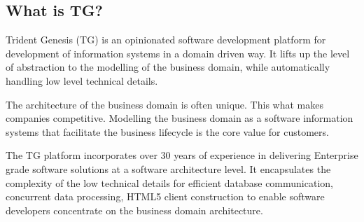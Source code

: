 \documentclass[a4paper,12pt,twocolumn,oneside,openright,final]{memoir}
\begin{document}
\BgThispage
\subsection*{What is TG?}
  Trident Genesis (TG) is an opinionated software development platform for development of information systems in a domain driven way.
  It lifts up the level of abstraction to the modelling of the business domain, while automatically handling low level technical details.
  
  \vspace{5 mm}
  \noindent The architecture of the business domain is often unique. 
  This what makes companies competitive.
  Modelling the business domain as a software information systems that facilitate the business lifecycle is the core value for customers.
  
  \vspace{5 mm}
  \noindent The TG platform incorporates over 30 years of experience in delivering Enterprise grade software solutions at a software architecture level.
  It encapsulates the complexity of the low technical details for efficient database communication, concurrent data processing, HTML5 client construction to enable software developers concentrate on the business domain architecture.


  \begin{figure}[!h]
    \vspace{0pt}
    \centering   
    \vspace{-10pt}
  \end{figure}
\end{document}
